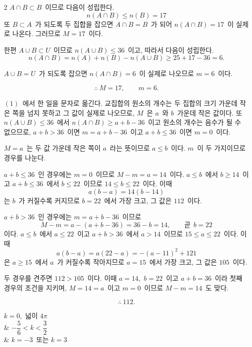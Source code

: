 \documentclass[10pt,fleqn]{article}
\begin{document}
\begin{multicols*}{2}
 $A\cap B\subset B$\ 이므로 다음이 성립한다.
$$n(A\cap B)\le n(B)=17$$
또 $B\subset A$\ 가 되도록 두 집합을 잡으면 $A\cap B=B$\ 가 되어 $n(A\cap B)=17$\ 이 실제로 나온다. 그러므로 $M=17$\ 이다.

한편 $A\cup B\subset U$\ 이므로 $n(A\cup B)\le 36$\ 이고, 따라서 다음이 성립한다.
$$n(A\cap B)=n(A)+n(B)-n(A\cup B)\ge 25+17-36=6.$$

$A\cup B=U$\ 가 되도록 잡으면 $n(A\cap B)=6$\ 이 실제로 나오므로 $m=6$\ 이다.

$$\therefore\ M=17,\qquad m=6.$$

 $(1)$\ 에서 한 일을 문자로 옮긴다. 교집합의 원소의 개수는 두 집합의 크기 가운데 작은 쪽을 넘지 못하고 그 값이 실제로 나오므로, $M$\ 은 $a$\ 와 $b$\ 가운데 작은 값이다. 또 $n(A\cup B)\le 36$\ 에서 $n(A\cap B)\ge a+b-36$\ 이고 원소의 개수는 음수가 될 수 없으므로, $a+b>36$\ 이면 $m=a+b-36$\ 이고 $a+b\le 36$\ 이면 $m=0$\ 이다.

$M=a$\ 는 두 값 가운데 작은 쪽이 $a$\ 라는 뜻이므로 $a\le b$\ 이다. $m$\ 이 두 가지이므로 경우를 나눈다.

$a+b\le 36$\ 인 경우에는 $m=0$\ 이므로 $M-m=a=14$\ 이다. $a\le b$\ 에서 $b\ge 14$\ 이고 $a+b\le 36$\ 에서 $b\le 22$\ 이므로 $14\le b\le 22$\ 이다. 이때
$$a(b-a)=14(b-14)$$
는 $b$\ 가 커질수록 커지므로 $b=22$\ 에서 가장 크고, 그 값은 $112$\ 이다.

$a+b>36$\ 인 경우에는 $m=a+b-36$\ 이므로
$$M-m=a-(a+b-36)=36-b=14,\qquad \text{곧}\ \ b=22$$
이다. $a\le b$\ 에서 $a\le 22$\ 이고 $a+b>36$\ 에서 $a>14$\ 이므로 $15\le a\le 22$\ 이다. 이때
$$a(b-a)=a(22-a)=-(a-11)^{2}+121$$
은 $a\ge 15$\ 에서 $a$\ 가 커질수록 작아지므로 $a=15$\ 에서 가장 크고, 그 값은 $105$\ 이다.

두 경우를 견주면 $112>105$\ 이다. 이때 $a=14$,\ $b=22$\ 이고 $a+b=36$\ 이라 첫째 경우의 조건을 지키며, $M=14=a$\ 이고 $m=0$\ 이므로 $M-m=14$\ 도 맞다.

$$\therefore\ 112.$$


\begin{dmanslist}
 $k=0$,\ 넓이 $4\pi$\\
&  $-\dfrac56<k<\dfrac32$\\
&  $k=-3$\ 또는 $k=3$
\end{dmanslist}


\end{multicols*}
\end{document}
